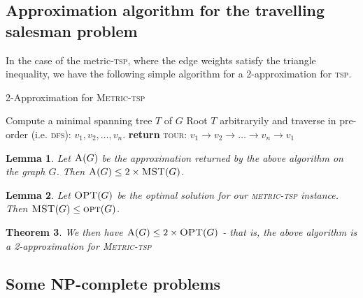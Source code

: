 \documentclass[10pt, oneside, reqno]{amsart}
\theoremstyle{plain}%
\newtheorem{thm}{Theorem}[section]
\newtheorem{lem}[thm]{Lemma}
\theoremstyle{definition}
\theoremstyle{remark}
\begin{document}
\subsection{Approximation algorithm for the travelling salesman problem} %
\label{sub:approximation_algorithm_for_the_travelling_salesman_problem}
In the case of the metric-\textsc{tsp}, where the edge weights satisfy the triangle inequality, we have the following simple algorithm for a 2-approximation for \textsc{tsp}.  

 
\begin{algorithm}[H]
    \label{alg:dynamic_rising_trend}
    \caption{2-Approximation for \textsc{Metric-tsp}}
    \begin{algorithmic}[1]
        \State Compute a minimal spanning tree $T$ of $G$
        \State Root $T$ arbitraryily and traverse in pre-order (i.e. \textsc{dfs}): $v_1, v_2, \dots, v_n$.
        \State \textbf{return} \textsc{tour: $v_1 \rightarrow v_2 \rightarrow \dots \rightarrow v_n \rightarrow v_1$}
    \EndProcedure
    \end{algorithmic}
\end{algorithm}

\begin{lem}
    Let $\textsc{A}(G)$ be the approximation returned by the above algorithm on the graph $G$.  Then $\textsc{A}(G) \leq  2 \times \textsc{MST}(G)$.
\end{lem}

\begin{lem}
    Let $\textsc{OPT}(G)$ be the optimal solution for our \textsc{metric-tsp} instance.  Then  $\textsc{MST}(G) \leq \textsc{opt}(G)$. 
\end{lem}
\begin{thm}
    We then have $\textsc{A}(G) \leq 2 \times \textsc{OPT}(G)$ - that is, the above algorithm is a 2-approximation for \textsc{Metric-tsp}
\end{thm}





\subsection{Some NP-complete problems}
\end{document}
